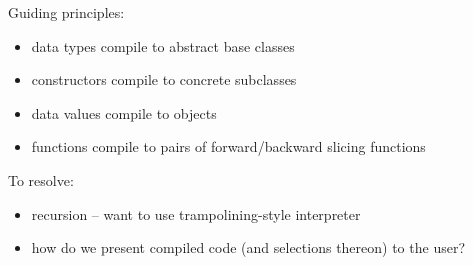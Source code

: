 
Guiding principles:
\begin{itemize}
   \item data types compile to abstract base classes
   \item constructors compile to concrete subclasses
   \item data values compile to objects
   \item functions compile to pairs of forward/backward slicing functions
\end{itemize}

\noindent To resolve:
\begin{itemize}
   \item recursion -- want to use trampolining-style interpreter
   \item how do we present compiled code (and selections thereon) to the user?
\end{itemize}


